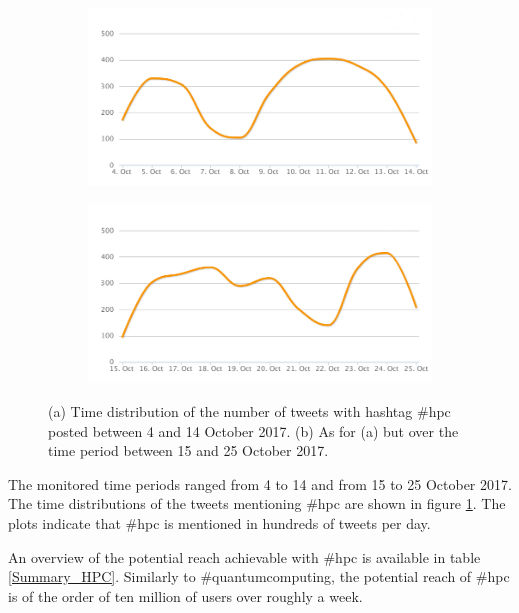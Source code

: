 \begin{figure}
 \centering
 \begin{subfigure}[b]{0.95\textwidth}
   \includegraphics[width=1\linewidth]{Images/FirstSearch_HPC.png}
   \caption{} 
 \end{subfigure}

 \begin{subfigure}[b]{0.95\textwidth}
   \includegraphics[width=1\linewidth]{Images/SecondSearch_HPC.png}
   \caption{}
 \end{subfigure}
 \caption{(a) Time distribution of the number of tweets with hashtag \#hpc posted between 4 and 14 October 2017. (b) As for (a) but over the time period between 15 and 25 October 2017.} 
 \label{First-SecondSearch_HPC}
\end{figure}

The monitored time periods ranged from 4 to 14 and from 15 to 25 October 2017. The time distributions of the tweets mentioning \#hpc are shown in figure \ref{First-SecondSearch_HPC}. The plots indicate that \#hpc is mentioned in hundreds of tweets per day.

An overview of the potential reach achievable with \#hpc is available in table \ref{Summary_HPC}. Similarly to \#quantumcomputing, the potential reach of \#hpc is of the order of ten million of users over roughly a week. 

